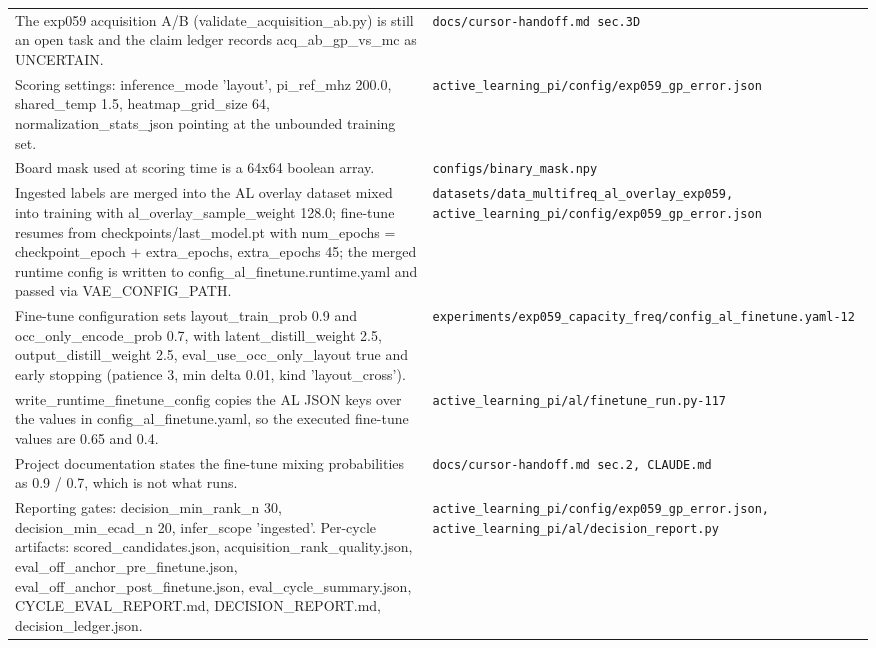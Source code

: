 \begin{longtable}{p{} p{}}
The exp059 acquisition A/B (validate\_acquisition\_ab.py) is still an open task and the claim ledger records acq\_ab\_gp\_vs\_mc as UNCERTAIN. & \texttt{docs/\allowbreak{}cursor-handoff.md sec.3D} \\
Scoring settings: inference\_mode 'layout', pi\_ref\_mhz 200.0, shared\_temp 1.5, heatmap\_grid\_size 64, normalization\_stats\_json pointing at the unbounded training set. & \texttt{active\_\allowbreak{}learning\_\allowbreak{}pi/\allowbreak{}config/\allowbreak{}exp059\_\allowbreak{}gp\_\allowbreak{}error.json} \\
Board mask used at scoring time is a 64x64 boolean array. & \texttt{configs/\allowbreak{}binary\_\allowbreak{}mask.npy} \\
Ingested labels are merged into the AL overlay dataset mixed into training with al\_overlay\_sample\_weight 128.0; fine-tune resumes from checkpoints/last\_model.pt with num\_epochs = checkpoint\_epoch + extra\_epochs, extra\_epochs 45; the merged runtime config is written to config\_al\_finetune.runtime.yaml and passed via VAE\_CONFIG\_PATH. & \texttt{datasets/\allowbreak{}data\_\allowbreak{}multifreq\_\allowbreak{}al\_\allowbreak{}overlay\_\allowbreak{}exp059, active\_\allowbreak{}learning\_\allowbreak{}pi/\allowbreak{}config/\allowbreak{}exp059\_\allowbreak{}gp\_\allowbreak{}error.json} \\
Fine-tune configuration sets layout\_train\_prob 0.9 and occ\_only\_encode\_prob 0.7, with latent\_distill\_weight 2.5, output\_distill\_weight 2.5, eval\_use\_occ\_only\_layout true and early stopping (patience 3, min delta 0.01, kind 'layout\_cross'). & \texttt{experiments/\allowbreak{}exp059\_\allowbreak{}capacity\_\allowbreak{}freq/\allowbreak{}config\_\allowbreak{}al\_\allowbreak{}finetune.yaml-12} \\
write\_runtime\_finetune\_config copies the AL JSON keys over the values in config\_al\_finetune.yaml, so the executed fine-tune values are 0.65 and 0.4. & \texttt{active\_\allowbreak{}learning\_\allowbreak{}pi/\allowbreak{}al/\allowbreak{}finetune\_\allowbreak{}run.py-117} \\
Project documentation states the fine-tune mixing probabilities as 0.9 / 0.7, which is not what runs. & \texttt{docs/\allowbreak{}cursor-handoff.md sec.2, CLAUDE.md} \\
Reporting gates: decision\_min\_rank\_n 30, decision\_min\_ecad\_n 20, infer\_scope 'ingested'. Per-cycle artifacts: scored\_candidates.json, acquisition\_rank\_quality.json, eval\_off\_anchor\_pre\_finetune.json, eval\_off\_anchor\_post\_finetune.json, eval\_cycle\_summary.json, CYCLE\_EVAL\_REPORT.md, DECISION\_REPORT.md, decision\_ledger.json. & \texttt{active\_\allowbreak{}learning\_\allowbreak{}pi/\allowbreak{}config/\allowbreak{}exp059\_\allowbreak{}gp\_\allowbreak{}error.json, active\_\allowbreak{}learning\_\allowbreak{}pi/\allowbreak{}al/\allowbreak{}decision\_\allowbreak{}report.py} \\

\end{longtable}
